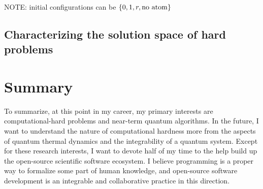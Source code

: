 \documentclass[a4paper]{article}
\newcommand{\<}{\langle}
\renewcommand{\>}{\rangle}
\begin{document}
NOTE: initial configurations can be $\{0, 1, r, {\rm no~atom}\}$
\subsection{Characterizing the solution space of hard problems}


\section{Summary}
To summarize, at this point in my career, my primary interests are computational-hard problems and near-term quantum algorithms.
In the future, I want to understand the nature of computational hardness more from the aspects of quantum thermal dynamics and the integrability of a quantum system.
Except for these research interests, I want to devote half of my time to the help build up the open-source scientific software ecosystem.
I believe programming is a proper way to formalize some part of human knowledge, and open-source software development is an integrable and collaborative practice in this direction.


\end{document}
